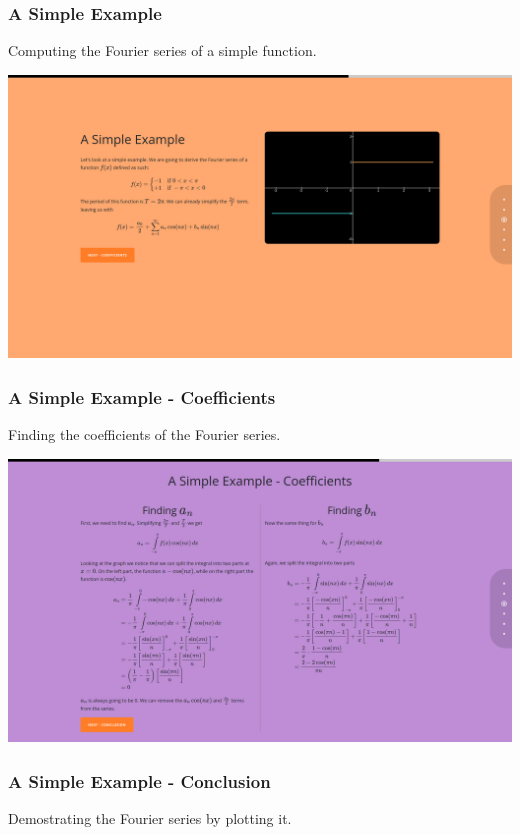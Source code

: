 \documentclass{article}
\begin{document}
\subsubsection{A Simple Example}

Computing the Fourier series of a simple function.

\includegraphics[width=\textwidth]{chap12.png}

\subsubsection{A Simple Example - Coefficients}

Finding the coefficients of the Fourier series.

\includegraphics[width=\textwidth]{chap13.png}

\subsubsection{A Simple Example - Conclusion}

Demostrating the Fourier series by plotting it.
\end{document}
